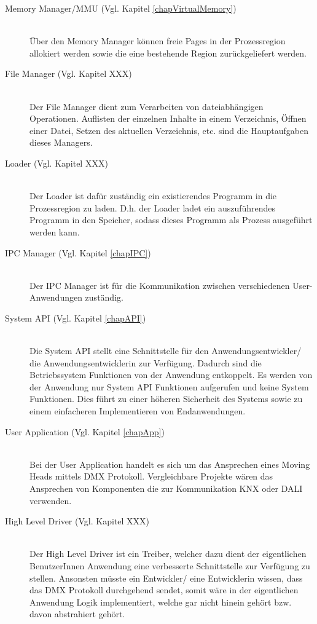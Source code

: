 \begin{description}
	\item[Memory Manager/MMU (Vgl. Kapitel \ref{chapVirtualMemory})] \hfill \\
	Über den Memory Manager können freie Pages in der Prozessregion allokiert werden sowie die eine bestehende Region zurückgeliefert werden.

	\item[File Manager (Vgl. Kapitel XXX)] \hfill \\
	Der File Manager dient zum Verarbeiten von dateiabhängigen Operationen. Auflisten der einzelnen Inhalte in einem Verzeichnis, Öffnen einer Datei, Setzen des aktuellen Verzeichnis, etc. sind die Hauptaufgaben dieses Managers.
	
	\item[Loader (Vgl. Kapitel XXX)] \hfill \\
	Der Loader ist dafür zuständig ein existierendes Programm in die Prozessregion zu laden. D.h. der Loader ladet ein auszuführendes Programm in den Speicher, sodass dieses Programm als Prozess ausgeführt werden kann.
	
	\item[IPC Manager (Vgl. Kapitel \ref{chapIPC})] \hfill \\
	Der IPC Manager ist für die Kommunikation zwischen verschiedenen User-Anwendungen zuständig.
	
	\item[System API (Vgl. Kapitel \ref{chapAPI})] \hfill \\
	Die System API stellt eine Schnittstelle für den Anwendungsentwickler/ die Anwendungsentwicklerin zur Verfügung. Dadurch sind die Betriebssystem Funktionen von der Anwendung entkoppelt. Es werden von der Anwendung nur System API Funktionen aufgerufen und keine System Funktionen. Dies führt zu einer höheren Sicherheit des Systems sowie zu einem einfacheren Implementieren von Endanwendungen.
	
	\item[User Application (Vgl. Kapitel \ref{chapApp})] \hfill \\
	Bei der User Application handelt es sich um das Ansprechen eines Moving Heads mittels DMX Protokoll. Vergleichbare Projekte wären das Ansprechen von Komponenten die zur Kommunikation KNX oder DALI verwenden.
	
	\item[High Level Driver (Vgl. Kapitel XXX)] \hfill \\
	Der High Level Driver ist ein Treiber, welcher dazu dient der eigentlichen BenutzerInnen Anwendung eine verbesserte Schnittstelle zur Verfügung zu stellen. Ansonsten müsste ein Entwickler/ eine Entwicklerin wissen, dass das DMX Protokoll durchgehend sendet, somit wäre in der eigentlichen Anwendung Logik implementiert, welche gar nicht hinein gehört bzw. davon abstrahiert gehört.
\end{description}

\pagebreak 